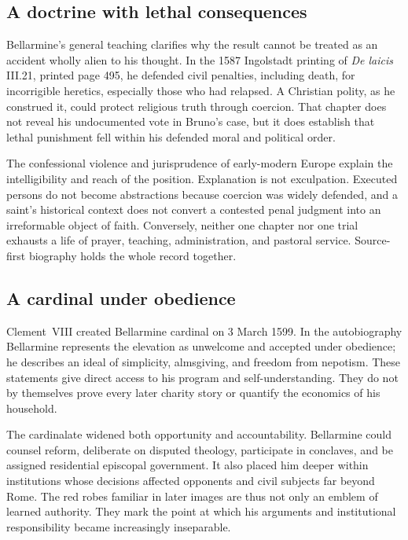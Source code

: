 \subsection{A doctrine with lethal consequences}

Bellarmine's general teaching clarifies why the result cannot be treated as an
accident wholly alien to his thought.  In the 1587 Ingolstadt printing of
\emph{De laicis} III.21, printed page 495, he defended civil penalties,
including death, for incorrigible heretics, especially those who had relapsed.
A Christian polity, as he construed it, could protect religious truth through
coercion.  That
chapter does not reveal his undocumented vote in Bruno's case, but it does
establish that lethal punishment fell within his defended moral and political
order.

The confessional violence and jurisprudence of early-modern Europe explain
the intelligibility and reach of the position.  Explanation is not
exculpation.  Executed persons do not become abstractions because coercion was
widely defended, and a saint's historical context does not convert a contested
penal judgment into an irreformable object of faith.  Conversely, neither one
chapter nor one trial exhausts a life of prayer, teaching, administration, and
pastoral service.  Source-first biography holds the whole record together.

\subsection{A cardinal under obedience}

Clement~VIII created Bellarmine cardinal on 3 March 1599.  In the
autobiography Bellarmine represents the elevation as unwelcome and accepted
under obedience; he describes an ideal of simplicity, almsgiving, and freedom
from nepotism.  These statements give direct access to his program and
self-understanding.  They do not by themselves prove every later charity
story or quantify the economics of his household.

The cardinalate widened both opportunity and accountability.  Bellarmine
could counsel reform, deliberate on disputed theology, participate in
conclaves, and be assigned residential episcopal government.  It also placed
him deeper within institutions whose decisions affected opponents and civil
subjects far beyond Rome.  The red robes familiar in later images are thus
not only an emblem of learned authority.  They mark the point at which his
arguments and institutional responsibility became increasingly inseparable.

